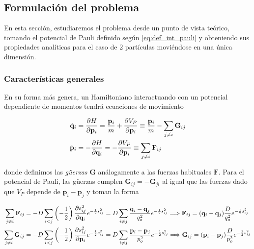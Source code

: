 \subsection{Formulación del problema}

En esta sección, estudiaremos el problema desde un punto de vista teórico, tomando el potencial de Pauli definido según \eqref{eq:def_int_pauli} y obteniendo sus propiedades analíticas para el caso de 2 partículas moviéndose en una única dimensión.

\subsubsection{Características generales}

En su forma más genera, un Hamiltoniano interactuando con un potencial dependiente de momentos tendrá ecuaciones de movimiento

\begin{align*}
\dot{\mathbf{q}}_i &= \frac{\partial H}{\partial\mathbf{p}_i} = \frac{\mathbf{p}_i}{m} + \frac{\partial V_P}{\partial\mathbf{p}_i} \equiv \frac{\mathbf{p}_i}{m} - \sum_{j\neq i} \mathbf{G}_{ij} \\
\dot{\mathbf{p}}_i &= -\frac{\partial H}{\partial\mathbf{q}_i} = -\frac{\partial V_P}{\partial\mathbf{p}_i} \equiv \sum_{j\neq i} \mathbf{F}_{ij}
\end{align*}

donde definimos las \textit{güerzas} $\mathbf{G}$ análogamente a las fuerzas habituales $\mathbf{F}$.
Para el potencial de Pauli, las güerzas cumplen $\mathbf{G}_{ij} = -\mathbf{G}_{ji}$ al igual que las fuerzas dado que $V_P$ depende de $\mathbf{p}_i - \mathbf{p}_j$ y toman la forma

\begin{align*}
\sum_{j\neq i} \mathbf{F}_{ij} &= -D \sum_{i<j} \left(-\frac{1}{2}\right)\frac{\partial s_{ij}^2}{\partial\mathbf{q}_i}e^{-\frac{1}{2}s_{ij}^2} = D \sum_{i\neq j} \frac{\mathbf{q}_i - \mathbf{q}_j}{q_o^2}e^{-\frac{1}{2}s_{ij}^2} \Longrightarrow \mathbf{F}_{ij} = (\mathbf{q}_i - \mathbf{q}_j)\frac{D}{q_o^2}e^{-\frac{1}{2}s_{ij}^2} \\
\sum_{j\neq i} \mathbf{G}_{ij} &= -D \sum_{i<j} \left(-\frac{1}{2}\right)\frac{\partial s_{ij}^2}{\partial\mathbf{p}_i}e^{-\frac{1}{2}s_{ij}^2} = D \sum_{i\neq j} \frac{\mathbf{p}_i - \mathbf{p}_j}{p_o^2}e^{-\frac{1}{2}s_{ij}^2} \Longrightarrow \mathbf{G}_{ij} = (\mathbf{p}_i - \mathbf{p}_j)\frac{D}{p_o^2}e^{-\frac{1}{2}s_{ij}^2}
\end{align*}

